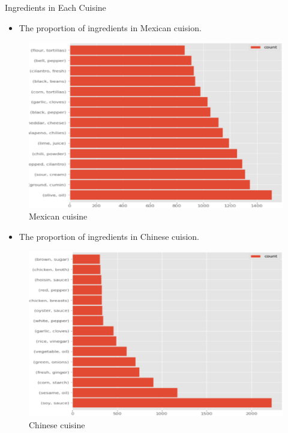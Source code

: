 \documentclass[
 size=14pt,
 paper=smartboard,  %
 mode=present, 		%
 display=slides, 	%
 style=tuliplab,  	%
 pauseslide,
 fleqn,leqno]{powerdot}
\begin{document}
\begin{slide}[toc=,bm=]{Ingredients in Each Cuisine}
  \twocolumn
  {
    
  \begin{itemize}
  \item
  \smallskip
  The proportion of ingredients in Mexican cuision.

 \end{itemize}
  \vspace{0.4cm}
  \begin{figure}
    \centering
    \includegraphics[width=1.0\textwidth,natwidth=840,natheight=550]{figures/me.eps}
    \caption{Mexican cuisine}\label{Checking for outliers}
  \end{figure}
  }
  {
  
  \begin{itemize}
  \item
  The proportion of ingredients in Chinese cuision.
  

  \end{itemize}
  \bigskip
  \begin{figure}
    \centering
    \includegraphics[width=1.0\textwidth,natwidth=840,natheight=550]{figures/ch.eps}
    \caption{Chinese cuisine}\label{Checking for outliers}
  \end{figure}
  }
  

\end{slide}
\end{document}
